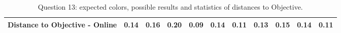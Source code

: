 \begin{table}[H]
{\begin{tabular}{lccccccccccccc}
    \multicolumn{4}{l}{Distance to Objective - Online}                                                                                               & \multicolumn{1}{|c}{0.14}        & \multicolumn{1}{c|}{0.16}    & \multicolumn{1}{|c}{0.20}        & \multicolumn{1}{c|}{0.09}    & \multicolumn{1}{|c}{0.14}       & \multicolumn{1}{c|}{0.11}    & \multicolumn{1}{|c}{\textbf{0.13}}        & \multicolumn{1}{c|}{0.15}    & \multicolumn{1}{|c}{0.14}       & \multicolumn{1}{c|}{0.11}    \\ \hline
    \end{tabular}}
  \caption[Question 13, with expected Results.]{Question 13: expected colors, possible results and statistics of distances to Objective.}
  \vspace{-5pt}
  \label{table:lab_q13_expected}
\end{table}
%

